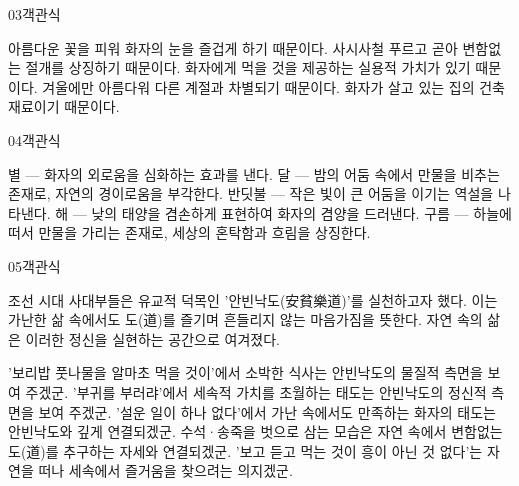\documentclass[fs85,seriesWit]{korfarm-base}
\begin{document}
\begin{kfQBlock}{03}{객관식}
\begin{kfChoices}
\kfChoice 아름다운 꽃을 피워 화자의 눈을 즐겁게 하기 때문이다.
\kfChoice 사시사철 푸르고 곧아 변함없는 절개를 상징하기 때문이다.
\kfChoice 화자에게 먹을 것을 제공하는 실용적 가치가 있기 때문이다.
\kfChoice 겨울에만 아름다워 다른 계절과 차별되기 때문이다.
\kfChoice 화자가 살고 있는 집의 건축 재료이기 때문이다.
\end{kfChoices}
\end{kfQBlock}

\begin{kfQBlock}{04}{객관식}
\begin{kfChoices}
\kfChoice 별 — 화자의 외로움을 심화하는 효과를 낸다.
\kfChoice 달 — 밤의 어둠 속에서 만물을 비추는 존재로, 자연의 경이로움을 부각한다.
\kfChoice 반딧불 — 작은 빛이 큰 어둠을 이기는 역설을 나타낸다.
\kfChoice 해 — 낮의 태양을 겸손하게 표현하여 화자의 겸양을 드러낸다.
\kfChoice 구름 — 하늘에 떠서 만물을 가리는 존재로, 세상의 혼탁함과 흐림을 상징한다.
\end{kfChoices}
\end{kfQBlock}

\begin{kfQBlock}{05}{객관식}
\begin{kfEvidence}조선 시대 사대부들은 유교적 덕목인 '안빈낙도(安貧樂道)'를 실천하고자 했다. 이는 가난한 삶 속에서도 도(道)를 즐기며 흔들리지 않는 마음가짐을 뜻한다. 자연 속의 삶은 이러한 정신을 실현하는 공간으로 여겨졌다.\end{kfEvidence}
\begin{kfChoices}
\kfChoice '보리밥 풋나물을 알마초 먹을 것이'에서 소박한 식사는 안빈낙도의 물질적 측면을 보여 주겠군.
\kfChoice '부귀를 부러랴'에서 세속적 가치를 초월하는 태도는 안빈낙도의 정신적 측면을 보여 주겠군.
\kfChoice '설운 일이 하나 없다'에서 가난 속에서도 만족하는 화자의 태도는 안빈낙도와 깊게 연결되겠군.
\kfChoice 수석·송죽을 벗으로 삼는 모습은 자연 속에서 변함없는 도(道)를 추구하는 자세와 연결되겠군.
\kfChoice '보고 듣고 먹는 것이 흥이 아닌 것 없다'는 자연을 떠나 세속에서 즐거움을 찾으려는 의지겠군.
\end{kfChoices}
\end{kfQBlock}
\end{document}

